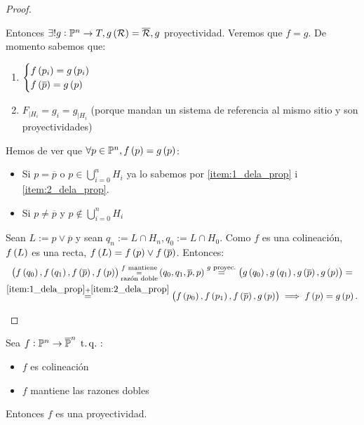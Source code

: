 \begin{proof}
\begin{itemize}
        Entonces $\exists! g : \mathbb{P}^n \to T, g \left( \mathcal{R} \right) = \overline{\mathcal{R}}, g$ proyectividad. Veremos que $f = g$.
        De momento sabemos que:
        \begin{enumerate}[(1)]
            \item\label{item:1_dela_prop} $\begin{cases} f \left( p_i \right) = g \left( p_i \right) \\ f \left( \overline{p} \right) = g \left( p \right) \end{cases}$
            \item\label{item:2_dela_prop} $F_{|H_i} = g_i = g_{|H_i}$ (porque mandan un sistema de referencia al mismo sitio y son proyectividades)
        \end{enumerate}
        Hemos de ver que $\forall p \in \mathbb{P}^n, f \left( p \right) = g \left( p \right)$:
        \begin{itemize}
            \item Si $p = \overline{p}$ o $p \in \bigcup_{i=0}^n H_i$ ya lo sabemos por \eqref{item:1_dela_prop} i \eqref{item:2_dela_prop}.
            \item Si $p \neq \overline{p}$ y $p \notin \bigcup_{i=0}^n H_i$
        \end{itemize}
        Sean $L := p \vee \overline{p}$ y sean $q_n := L \cap H_n, q_0 := L \cap H_0$. Como $f$ es una colineación, $f \left( L \right)$ es una recta, $f \left( L \right) = f \left( p \right) \vee f \left( \overline{p} \right)$.
        Entonces:
        \begin{gather*}
            \left( f \left( q_0 \right), f \left( q_1 \right), f \left( \overline{p} \right), f \left( p \right) \right) \substack{f \text{ mantiene} \\ = \\ \text{razón doble}} \left( q_0, q_1, \overline{p}, p \right) \stackrel{g \text{ proyec.}}{=} \left( g \left( q_0 \right), g \left( q_1 \right), g \left( \overline{p} \right), g \left( p \right) \right) = \\
            \stackrel{\eqref{item:1_dela_prop} + \eqref{item:2_dela_prop}}{=} \left( f \left( p_0 \right), f \left( p_1 \right), f \left( \overline{p} \right), g \left( p \right) \right) \implies f \left( p \right) = g \left( p \right).
        \end{gather*}
    \end{itemize}
\end{proof}
\begin{teo*} \label{teo:proyectividades}
    Sea $f : \mathbb{P}^n \to \overline{\mathbb{P}}^n \operatorname{\;t.q.\;}$:
    \begin{itemize}
        \item $f$ es colineación
        \item $f$ mantiene las razones dobles
    \end{itemize}
    Entonces $f$ es una proyectividad.
\end{teo*}
